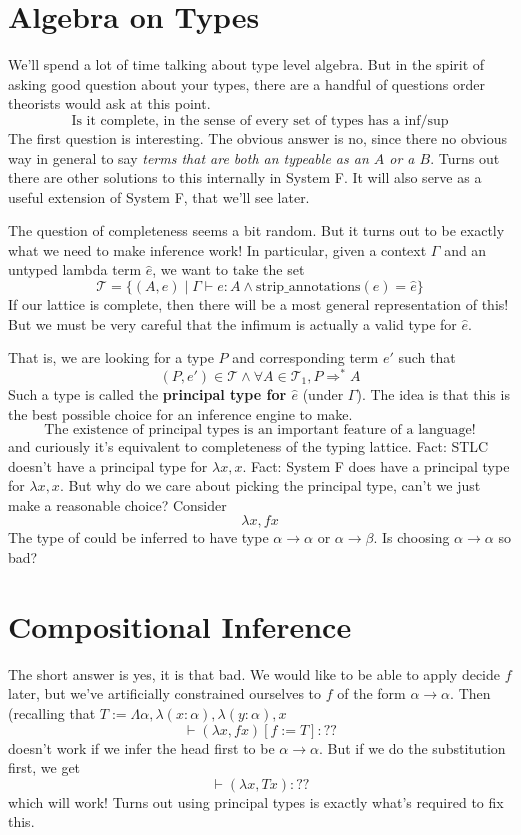 \documentclass[12pt]{article}
\begin{document}
\section{Algebra on Types}
We'll spend a lot of time talking about type level algebra.
But in the spirit of asking good question about your types, there are a handful of questions order theorists would ask at this point.
\[
    \text{Is it complete, in the sense of every set of types has a inf/sup}
\]
The first question is interesting.
The obvious answer is no, since there no obvious way in general to say \textit{terms that are both an typeable as an $A$ or a $B$}.
Turns out there are other solutions to this internally in System F.
It will also serve as a useful extension of System F, that we'll see later.

The question of completeness seems a bit random.
But it turns out to be exactly what we need to make inference work!
In particular, given a context $\Gamma$ and an untyped lambda term $\hat{e}$, we want to take the set 
\[
  \mathcal{T} = \{(A,e) \;|\; \Gamma \vdash e : A \land \text{strip\_annotations}(e) = \hat{e} \}
\]
If our lattice is complete, then there will be a most general representation of this!
But we must be very careful that the infimum is actually a valid type for $\hat{e}$.

That is, we are looking for a type $P$ and corresponding term $e'$ such that 
\[
  (P,e') \in \mathcal{T} \land \forall A \in \mathcal{T}_1, P \Rightarrow^* A
\]
Such a type is called the \textbf{principal type for $\hat{e}$} (under $\Gamma$).
The idea is that this is the best possible choice for an inference engine to make.
\[
\text{The existence of principal types is an important feature of a language!}
\]
and curiously it's equivalent to completeness of the typing lattice. 
Fact: STLC doesn't have a principal type for $\lambda x, x$. 
Fact: System F does have a principal type for $\lambda x, x$. 
But why do we care about picking the principal type, can't we just make a reasonable choice?
Consider
\[
  \lambda x, f x 
\]
The type of could be inferred to have type $\alpha \rightarrow \alpha$ or $\alpha \rightarrow \beta$.
Is choosing $\alpha \rightarrow \alpha$ so bad?

\section{Compositional Inference}
The short answer is yes, it is that bad. 
We would like to be able to apply decide $f$ later, but we've artificially constrained ourselves to $f$ of the form $\alpha \rightarrow \alpha$.
Then (recalling that $T := \Lambda \alpha, \lambda (x : \alpha),\lambda (y : \alpha), x$
\[
  \vdash (\lambda x, f x)[f := T] : ??
\]
doesn't work if we infer the head first to be $\alpha \rightarrow \alpha$. 
But if we do the substitution first, we get 
\[
  \vdash (\lambda x, T x) : ??
\]
which will work!
Turns out using principal types is exactly what's required to fix this.
\end{document}
